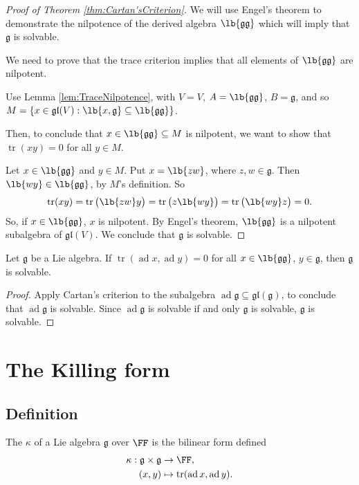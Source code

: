 \documentclass{article}
\DeclarePairedDelimiter\lb\lbrack\rbrack
\DeclareMathOperator{\tr}{tr}
\newcommand*\ad{\operatorname{ad}}
\newcommand*\frkg{{\ensuremath{\mathfrak{g}}}}
\newcommand*\gl{\ensuremath{\mathfrak{gl}}}
\begin{document}
\begin{proof}[Proof of Theorem \ref{thm:Cartan'sCriterion}]
    We will use Engel's theorem to demonstrate the nilpotence of the derived algebra $\lb{\frkg\frkg}$ which will imply that $\frkg$ is solvable.

    We need to prove that the trace criterion implies that all elements of $\lb{\frkg\frkg}$ are nilpotent.

    Use Lemma \ref{lem:TraceNilpotence}, with $V = V$, $A = \lb{\frkg\frkg}$, $B = \frkg$, and so $M = \{x \in \gl(V): \lb{x,\frkg} \subseteq \lb{\frkg\frkg}\}$.

    Then, to conclude that $x \in \lb{\frkg\frkg} \subseteq M$ is nilpotent, we want to show that $\tr(xy) = 0$ for all $y \in M$.

    Let $x \in \lb{\frkg\frkg}$ and $y \in M$.
    Put $x = \lb{zw}$, where $z,w \in \frkg$.
    Then $\lb{wy} \in \lb{\frkg\frkg}$, by $M$'s definition.
    So
    \[
        \tr(xy)
        =
        \tr\big(\lb{zw}y\big)
        =
        \tr\big(z\lb{wy}\big)
        =
        \tr\big(\lb{wy}z\big)
        =
        0.
    \]
    So, if $x \in \lb{\frkg\frkg}$, $x$ is nilpotent.
    By Engel's theorem, $\lb{\frkg\frkg}$ is a nilpotent subalgebra of $\gl(V)$.
    We conclude that $\frkg$ is solvable.
\end{proof}

\begin{corollary}
    Let $\frkg$ be a Lie algebra.
    If $\tr(\ad x, \ad y) = 0$ for all $x \in \lb{\frkg\frkg}$, $y \in \frkg$, then $\frkg$ is solvable.
\end{corollary}

\begin{proof}
    Apply Cartan's criterion to the subalgebra $\ad \frkg \subseteq \gl(\frkg)$, to conclude that $\ad \frkg$ is solvable.
    Since $\ad \frkg$ is solvable if and only $\frkg$ is solvable, $\frkg$ is solvable.
\end{proof}

\section{The Killing form \cite[\S 5]{Hum72}}

\subsection{Definition}

\begin{definition}
    The  $\kappa$ of a Lie algebra $\frkg$ over $\FF$ is the bilinear form defined
    \begin{align*}
        \kappa:
        \frkg \times \frkg 
        &\to
        \FF, \\
        (x, y)
        &\mapsto
        \tr(\ad x, \ad y).
    \end{align*}
\end{definition}
\end{document}
